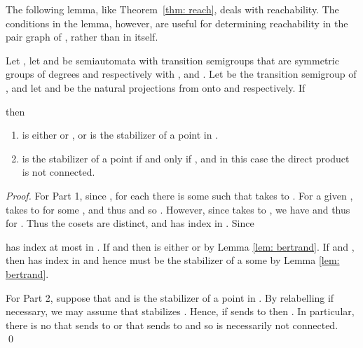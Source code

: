 \documentclass{llncs}
\newcommand{\be}{\begin{enumerate}}
\newcommand{\ee}{\end{enumerate}}
\begin{document}
The following lemma, like Theorem~\ref{thm: reach}, deals with reachability. The conditions in the lemma, however, are useful for determining reachability in the pair graph of , rather than in   itself.
\begin{lemma}
Let  , let  and  be 
semiautomata with transition semigroups  that are  symmetric groups  of degrees  and  respectively with ,  and .  
Let  be the transition semigroup of , and let  and  be the natural projections from  onto  and  respectively. If
 
then 
\be
\item  is either  or , or is the stabilizer of a point in . 
\item
 is the stabilizer of a point if and only if , and in this case the direct product  is not connected.
\ee
\label{lem: H0}
\end{lemma}
\begin{proof}
For Part 1, 
since , for each  there is some  such that  takes  to .  For a given ,  takes  to  for some , and thus  and so .  However, since  takes  to , we have  and thus  for . Thus the cosets  are distinct, and   has index  in .  Since 
 
 has index at most  in .   If  and  then  is either  or  by Lemma \ref{lem: bertrand}. 
If  and , then  has index  in  and hence must be the stabilizer of a some  by Lemma \ref{lem: bertrand}.  

For Part 2, suppose that  and  is the stabilizer of a point in .
By relabelling if necessary, we may assume that  stabilizes .  Hence, if  sends  to  then .  In particular, there is no  that sends  to  or that sends  to  and so  is necessarily not connected.
\qed
\end{proof}
\end{document}
